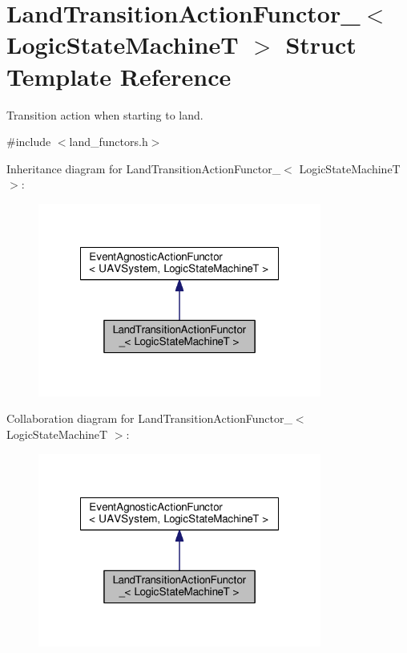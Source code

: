 \hypertarget{structLandTransitionActionFunctor__}{\section{Land\-Transition\-Action\-Functor\-\_\-$<$ Logic\-State\-Machine\-T $>$ Struct Template Reference}
\label{structLandTransitionActionFunctor__}
}


Transition action when starting to land.  




{\ttfamily \#include $<$land\-\_\-functors.\-h$>$}



Inheritance diagram for Land\-Transition\-Action\-Functor\-\_\-$<$ Logic\-State\-Machine\-T $>$\-:\nopagebreak
\begin{figure}[H]
\begin{center}
\leavevmode
\includegraphics[width=264pt]{structLandTransitionActionFunctor____inherit__graph}
\end{center}
\end{figure}


Collaboration diagram for Land\-Transition\-Action\-Functor\-\_\-$<$ Logic\-State\-Machine\-T $>$\-:\nopagebreak
\begin{figure}[H]
\begin{center}
\leavevmode
\includegraphics[width=264pt]{structLandTransitionActionFunctor____coll__graph}
\end{center}
\end{figure}
